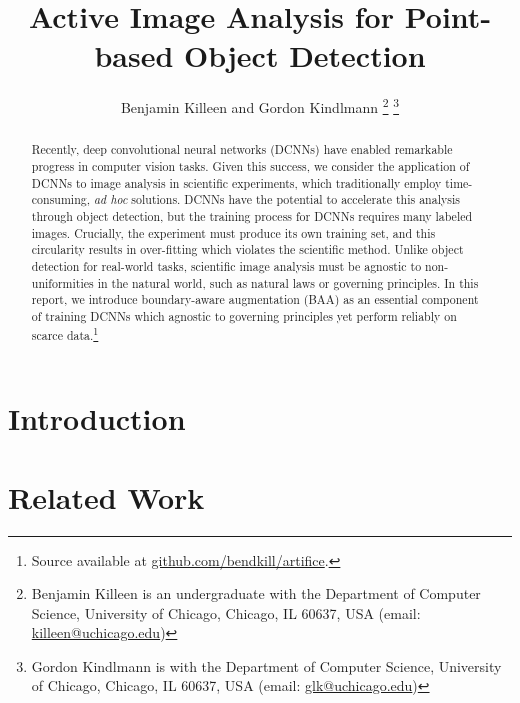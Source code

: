 \documentclass[10pt, draftcls]{IEEEtran}
\title{Active Image Analysis for Point-based Object Detection}
\author{Benjamin Killeen and Gordon Kindlmann %
  \thanks{Benjamin Killeen is an undergraduate with the Department of Computer
    Science, University of Chicago, Chicago, IL 60637, USA (email:
    \href{mailto:killeen@uchicago.edu}{killeen@uchicago.edu})} %
  \thanks{Gordon Kindlmann is with the Department of Computer Science, 
    University of Chicago, Chicago, IL 60637, USA (email:
    \href{mailto:glk@uchicago.edu}{glk@uchicago.edu})} %
}
\begin{document}
\maketitle

\begin{abstract}
  Recently, deep convolutional neural networks (DCNNs) have enabled remarkable
  progress in computer vision tasks. Given this success, we consider the
  application of DCNNs to image analysis in scientific experiments, which
  traditionally employ time-consuming, \emph{ad hoc} solutions. DCNNs have the
  potential to accelerate this analysis through object detection, but the
  training process for DCNNs requires many labeled images. Crucially, the
  experiment must produce its own training set, and this circularity results in
  over-fitting which violates the scientific method. Unlike object detection for
  real-world tasks, scientific image analysis must be agnostic to
  non-uniformities in the natural world, such as natural laws or governing
  principles. In this report, we introduce boundary-aware augmentation (BAA) as
  an essential component of training DCNNs which agnostic to governing
  principles yet perform reliably on scarce data.\footnote{Source available at
    \href{https://github.com/bendkill/artifice} {github.com/bendkill/artifice}.}
\end{abstract}

\section{Introduction}
\label{sec:introduction}

\section{Related Work}
\label{sec:related-work}






% 
\end{document}
